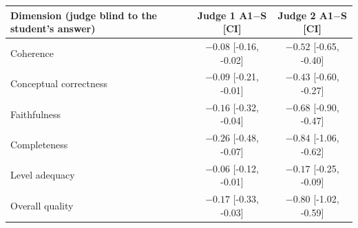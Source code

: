 \begin{tabular}{lcc}
\toprule
Dimension (judge blind to the student's answer) & Judge 1 A1$-$S [CI] & Judge 2 A1$-$S [CI] \\
\midrule
Coherence & $-0.08$ [-0.16, -0.02] & $-0.52$ [-0.65, -0.40] \\
Conceptual correctness & $-0.09$ [-0.21, -0.01] & $-0.43$ [-0.60, -0.27] \\
Faithfulness & $-0.16$ [-0.32, -0.04] & $-0.68$ [-0.90, -0.47] \\
Completeness & $-0.26$ [-0.48, -0.07] & $-0.84$ [-1.06, -0.62] \\
Level adequacy & $-0.06$ [-0.12, -0.01] & $-0.17$ [-0.25, -0.09] \\
Overall quality & $-0.17$ [-0.33, -0.03] & $-0.80$ [-1.02, -0.59] \\
\bottomrule
\end{tabular}